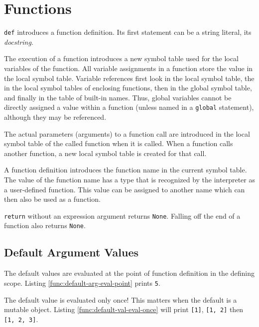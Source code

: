 \section{Functions}

\verb=def= introduces a function definition.
Its first statement can be a string literal, its \emph{docstring}.

The execution of a function introduces a new symbol table
used for the local variables of the function.
All variable assignments in a function
store the value in the local symbol table.
Variable references first look in the local symbol table,
the in the local symbol tables of enclosing functions,
then in the global symbol table, and finally in the table of built-in names.
Thus, global variables cannot be directly assigned a value within a function
(unless named in a \verb=global= statement), although they may be referenced.

The actual parameters (arguments) to a function call
are introduced in the local symbol table of the called function
when it is called.
When a function calls another function,
a new local symbol table is created for that call.

A function definition introduces the function name in the current symbol table.
The value of the function name has a type
that is recognized by the interpreter as a user-defined function.
This value can be assigned to another name
which can then also be used as a function.

\verb=return= without an expression argument returns \verb=None=.
Falling off the end of a function also returns \verb=None=.

\subsection{Default Argument Values}

The default values are evaluated at the point of function definition
in the defining scope.
Listing \ref{func:default-arg-eval-point} prints \verb=5=.

\begin{program}
\caption{Default arg values are evaluated at the point of function definition%
\label{func:default-arg-eval-point}}
\end{program}

The default value is evaluated only once!
This matters when the default is a mutable object.
Listing \ref{func:default-val-eval-once} will print
\verb=[1]=, \verb=[1, 2]= then \verb=[1, 2, 3]=.

